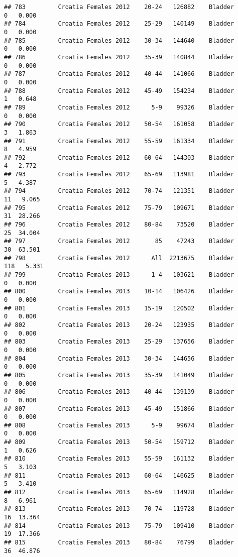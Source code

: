 \documentclass[
]{article}
\begin{document}
\begin{verbatim}
## 783         Croatia Females 2012    20-24   126882    Bladder      0   0.000
## 784         Croatia Females 2012    25-29   140149    Bladder      0   0.000
## 785         Croatia Females 2012    30-34   144640    Bladder      0   0.000
## 786         Croatia Females 2012    35-39   140844    Bladder      0   0.000
## 787         Croatia Females 2012    40-44   141066    Bladder      0   0.000
## 788         Croatia Females 2012    45-49   154234    Bladder      1   0.648
## 789         Croatia Females 2012      5-9    99326    Bladder      0   0.000
## 790         Croatia Females 2012    50-54   161058    Bladder      3   1.863
## 791         Croatia Females 2012    55-59   161334    Bladder      8   4.959
## 792         Croatia Females 2012    60-64   144303    Bladder      4   2.772
## 793         Croatia Females 2012    65-69   113981    Bladder      5   4.387
## 794         Croatia Females 2012    70-74   121351    Bladder     11   9.065
## 795         Croatia Females 2012    75-79   109671    Bladder     31  28.266
## 796         Croatia Females 2012    80-84    73520    Bladder     25  34.004
## 797         Croatia Females 2012       85    47243    Bladder     30  63.501
## 798         Croatia Females 2012      All  2213675    Bladder    118   5.331
## 799         Croatia Females 2013      1-4   103621    Bladder      0   0.000
## 800         Croatia Females 2013    10-14   106426    Bladder      0   0.000
## 801         Croatia Females 2013    15-19   120502    Bladder      0   0.000
## 802         Croatia Females 2013    20-24   123935    Bladder      0   0.000
## 803         Croatia Females 2013    25-29   137656    Bladder      0   0.000
## 804         Croatia Females 2013    30-34   144656    Bladder      0   0.000
## 805         Croatia Females 2013    35-39   141049    Bladder      0   0.000
## 806         Croatia Females 2013    40-44   139139    Bladder      0   0.000
## 807         Croatia Females 2013    45-49   151866    Bladder      0   0.000
## 808         Croatia Females 2013      5-9    99674    Bladder      0   0.000
## 809         Croatia Females 2013    50-54   159712    Bladder      1   0.626
## 810         Croatia Females 2013    55-59   161132    Bladder      5   3.103
## 811         Croatia Females 2013    60-64   146625    Bladder      5   3.410
## 812         Croatia Females 2013    65-69   114928    Bladder      8   6.961
## 813         Croatia Females 2013    70-74   119728    Bladder     16  13.364
## 814         Croatia Females 2013    75-79   109410    Bladder     19  17.366
## 815         Croatia Females 2013    80-84    76799    Bladder     36  46.876

\end{verbatim}
\end{document}
